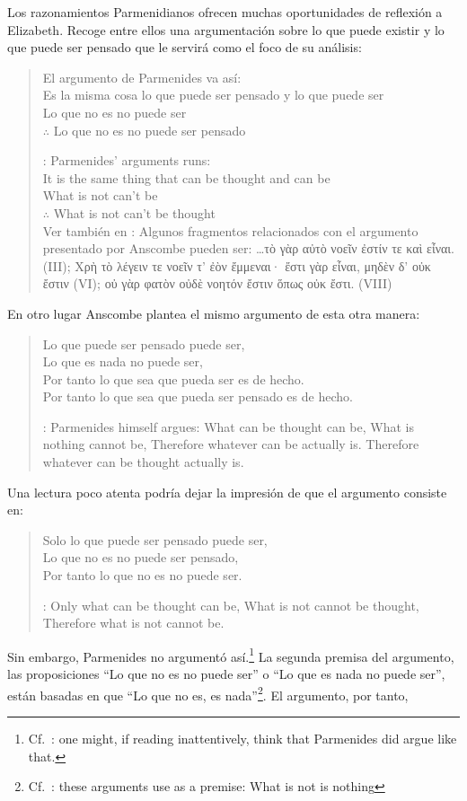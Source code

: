Los razonamientos Parmenidianos ofrecen muchas oportunidades de reflexión a
Elizabeth. Recoge entre ellos una argumentación sobre lo que puede existir y lo
que puede ser pensado que le servirá como el foco de su análisis:
\blockquote[{\cite[3]{anscombe1981parmenides:pmc}}: Parmenides' arguments runs:\\
It is the same thing that can be thought and can be\\
What is not can't be\\
$\therefore$ What is not can't be thought\\
Ver también en {\cite[22--25]{parmenides2007poema}}: Algunos fragmentos
relacionados con el argumento presentado por Anscombe pueden ser:
\ldots\textgreek{τὸ γὰρ αὐτὸ νοεῖν ἐστίν τε καὶ εἶναι.} (III); \textgreek{Χρὴ τὸ
  λέγειν τε νοεῖν τ' ἐὸν ἔμμεναι· ἔστι γὰρ εἶναι, μηδὲν δ' οὐκ ἔστιν} (VI);
\textelp{} \textgreek{οὐ γὰρ φατὸν οὐδὲ νοητόν ἔστιν ὅπως οὐκ ἔστι.} (VIII)]{El
  argumento de Parmenides va así:\\
  Es la misma cosa lo que puede ser pensado y lo que puede ser\\
  Lo que no es no puede ser\\
  $\therefore$ Lo que no es no puede ser pensado} En otro lugar Anscombe plantea
el mismo argumento de esta otra manera:
\blockquote[{\cite[vii]{anscombe1981parmenides}}: Parmenides himself argues:
What can be thought can be, What is nothing cannot be, Therefore whatever can be
actually is. Therefore whatever can be thought actually is.]
{Lo que puede ser pensado puede ser,\\
  Lo que es nada no puede ser,\\
  Por tanto lo que sea que pueda ser es de hecho.\\
  Por tanto lo que sea que pueda ser pensado es de hecho.} Una lectura poco
atenta podría dejar la impresión de que el argumento consiste en:
\blockquote[{\cite[vii]{anscombe1981parmenides}}: Only what can be thought can
be, What is not cannot be thought, Therefore what is not cannot be.]
{Solo lo que puede ser pensado puede ser,\\
  Lo que no es no puede ser pensado,\\
  Por tanto lo que no es no puede ser.} Sin embargo, Parmenides no argumentó
así.\footnote{Cf.~\cite[6]{anscombe1981parmenides:pmc}: \textelp{} one might, if
  reading inattentively, think that Parmenides did argue like that.} La segunda
premisa del argumento, las proposiciones \enquote{Lo que no es no puede ser} o
\enquote{Lo que es nada no puede ser}, están basadas en que \enquote{Lo que no
  es, es nada}\footnote{Cf.~\cite[vii]{anscombe1981parmenides}: these arguments
  \textelp{} use as a premise: What is not is nothing}. El argumento, por tanto,
